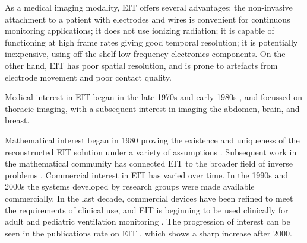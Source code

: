 \documentclass[10pt,journal]{IEEEtran}\def\TBLWIDA{15mm}\def\TBLWIDB{60mm}
\begin{document}
As a medical imaging modality, EIT offers several advantages:
the non-invasive attachment to a patient with electrodes and wires
is convenient for continuous monitoring applications;
it does not use ionizing radiation;
it is capable of functioning at high frame rates giving
good temporal resolution; 
it is potentially inexpensive, using off-the-shelf low-frequency electronics components. 
On the other hand, EIT has poor spatial resolution, and 
is prone to artefacts from electrode
movement and poor contact quality.



\begin{comment}
Medical applications of EIT have been a subject to active
research for nearly 40 years.
The last decade has seen a strong growth in 
clincal research and 
commercial interest, the availability of medically
certified devices, and early results from clinical use.

In the medical community, early work began in 
the late 1970s in USA \cite{Henderson78}, and
in the early 1980s in UK \cite{Barber1983}.
\end{comment}

Medical interest in EIT began in the late 1970s \cite{Henderson1978}
and early 1980s \cite{Barber1983}, and 
focussed on thoracic imaging,
with a subsequent interest in imaging the
abdomen, brain, and breast.
\begin{comment}
 From the late
1980s to the mid 1990s, much innovation in 
EIT was channelled through
a European Concerted Action on Impedance Tomography (CAIT),
as its associated European Community workshops on EIT.
After the end of the CAIT funding, the EIT technology community met through a
series of yearly International conferences on the biomedical applications of EIT.
\end{comment}
Mathematical interest began
in 1980 \cite{Calderon1980} proving
the existence and uniqueness of the reconstructed EIT solution 
under a variety of assumptions \cite{Sylvester1986Uniqueness}.
Subsequent work in the mathematical community has
connected EIT to the broader field
of inverse problems \cite{Uhlmann2009EIT}.
Commercial interest in EIT has varied over time. In the 1990s
and 2000s the systems developed by research groups were made
available commercially. In the last decade, 
commercial devices have been 
refined to meet the requirements of clinical use, and EIT
is beginning to be used clinically for adult and pediatric
ventilation monitoring \cite{Frerichs2017Chest}.
The progression of interest can be seen in 
the publications rate on EIT \cite{Adler2012Whither}, which
shows a sharp increase after 2000.
\end{document}
